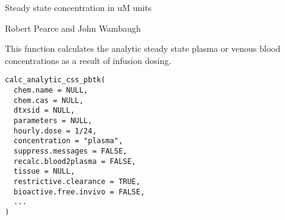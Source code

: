 \documentclass[a4paper]{book}
\begin{document}
%
\begin{Value}
Steady state concentration in uM units
\end{Value}
%
\begin{Author}\relax
Robert Pearce and John Wambaugh
\end{Author}
%
\begin{Description}\relax
This function calculates the analytic steady state plasma or venous blood 
concentrations as a result of infusion dosing.
\end{Description}
%
\begin{Usage}
\begin{verbatim}
calc_analytic_css_pbtk(
  chem.name = NULL,
  chem.cas = NULL,
  dtxsid = NULL,
  parameters = NULL,
  hourly.dose = 1/24,
  concentration = "plasma",
  suppress.messages = FALSE,
  recalc.blood2plasma = FALSE,
  tissue = NULL,
  restrictive.clearance = TRUE,
  bioactive.free.invivo = FALSE,
  ...
)
\end{verbatim}
\end{Usage}
%
\end{document}
